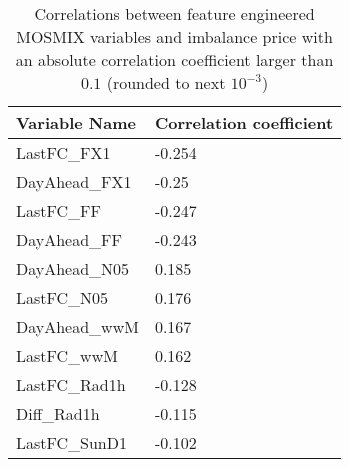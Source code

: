 \documentclass[class=scrbook, crop=false]{standalone}
\begin{document}
    
    \begin{table}
    \centering
    \begin{tabular}{l|l}
    Variable Name	& Correlation coefficient \\\hline
   	LastFC\_FX1	&-0.254\\
	DayAhead\_FX1	&-0.25\\
	LastFC\_FF		&-0.247\\
	DayAhead\_FF 	&-0.243\\
	DayAhead\_N05	&0.185\\
	LastFC\_N05	&0.176\\
	DayAhead\_wwM	&0.167\\
	LastFC\_wwM	&0.162\\
	LastFC\_Rad1h 	&-0.128\\
	Diff\_Rad1h          	&-0.115\\
	LastFC\_SunD1     	&-0.102\\
    \end{tabular}
    
    \caption{Correlations between feature engineered MOSMIX variables and imbalance price with an absolute correlation coefficient larger than $0.1$ (rounded to next $10^{-3}$)}
    \label{Table::imbalance_price_MOSMIX_correlations}
    \end{table}
    
\end{document}
